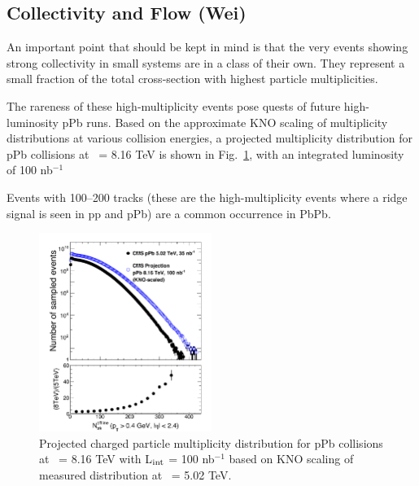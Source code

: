 \subsection{Collectivity and Flow (Wei)}

An important point that should be kept in mind is that the very events
showing strong collectivity in small systems are in a class of their own.
They represent a small fraction of the total cross-section with highest particle
multiplicities. 

The rareness of these high-multiplicity events pose quests of future high-luminosity pPb runs.
Based on the approximate KNO scaling of multiplicity distributions at various collision energies,
a projected multiplicity distribution for pPb collisions at \rootsNN\ = 8.16 TeV is shown
in Fig.~\ref{fig:Ntrk_pPb}, with an integrated luminosity of 100 nb$^{-1}$


Events with 100--200 tracks (these are the high-multiplicity events
where a ridge signal is seen in pp and pPb) are a common occurrence in
PbPb. 


\begin{figure}[thb]
  \begin{center}
    \includegraphics[width=0.5\textwidth]{figures/Ntrk.pdf}
    \caption{ Projected charged particle multiplicity distribution for pPb collisions at \rootsNN\ = 8.16 TeV
    with L$_{\rm int}$ = 100 nb$^{-1}$
    based on KNO scaling of measured distribution at \rootsNN\ = 5.02 TeV.
    }
    \label{fig:Ntrk_pPb}
  \end{center}
\end{figure} 

